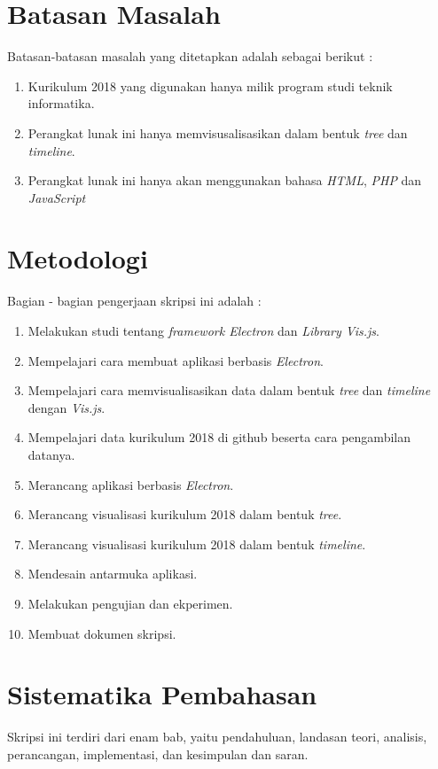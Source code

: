 \section{Batasan Masalah}
\label{sec:batasan}
Batasan-batasan masalah yang ditetapkan adalah sebagai berikut :
\begin{enumerate}
    \item Kurikulum 2018 yang digunakan hanya milik program studi teknik informatika.
    \item Perangkat lunak ini hanya memvisusalisasikan dalam bentuk \textit{tree} dan \textit{timeline}.
    \item Perangkat lunak ini hanya akan menggunakan bahasa \textit{HTML}, \textit{PHP} dan \textit{JavaScript}
\end{enumerate}



\section{Metodologi}
\label{sec:metlit}
Bagian - bagian pengerjaan skripsi ini adalah :
\begin{enumerate}
    \item Melakukan studi tentang \textit{framework Electron} dan \textit{Library Vis.js}.
    \item Mempelajari cara membuat aplikasi berbasis \textit{Electron}.
    \item Mempelajari cara memvisualisasikan data dalam bentuk \textit{tree} dan \textit{timeline} dengan \textit{Vis.js}.
    \item Mempelajari data kurikulum 2018 di github beserta cara pengambilan datanya.
    \item Merancang aplikasi berbasis \textit{Electron}.
    \item Merancang visualisasi kurikulum 2018 dalam bentuk \textit{tree}.
    \item Merancang visualisasi kurikulum 2018 dalam bentuk \textit{timeline}.
    \item Mendesain antarmuka aplikasi.
    \item Melakukan pengujian dan ekperimen.
    \item Membuat dokumen skripsi.
\end{enumerate}



\section{Sistematika Pembahasan}
\label{sec:sispem}
Skripsi ini terdiri dari enam bab, yaitu pendahuluan, landasan teori, analisis, perancangan, implementasi, dan kesimpulan dan saran. 

